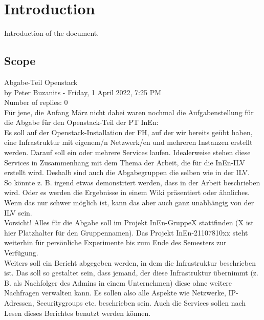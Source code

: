 \section{Introduction}
Introduction of the document.

\subsection{Scope}

Abgabe-Teil Openstack \\
by Peter Buzanits - Friday, 1 April 2022, 7:25 PM \\
Number of replies: 0 \\

\noindent
Für jene, die Anfang März nicht dabei waren nochmal die Aufgabenstellung für
die Abgabe für den Openstack-Teil der PT InEn: \\

\noindent
Es soll auf der Openstack-Installation der FH, auf der wir bereits geübt
haben, eine Infrastruktur mit eigenem/n Netzwerk/en und mehreren Instanzen
erstellt werden. Darauf soll ein oder mehrere Services laufen. Idealerweise
stehen diese Services in Zusammenhang mit dem Thema der Arbeit, die für die
InEn-ILV erstellt wird. Deshalb sind auch die Abgabegruppen die selben wie in
der ILV. \\

\noindent
So könnte z. B. irgend etwas demonstriert werden, dass in der Arbeit
beschrieben wird. Oder es werden die Ergebnisse in einem Wiki präsentiert oder
ähnliches. Wenn das nur schwer möglich ist, kann das aber auch ganz
unabhängig von der ILV sein. \\

\noindent
Vorsicht! Alles für die Abgabe soll im Projekt InEn-GruppeX stattfinden (X ist
hier Platzhalter für den Gruppennamen). Das Projekt InEn-21107810xx steht
weiterhin für persönliche Experimente bis zum Ende des Semesters zur
Verfügung. \\

\noindent
Weiters soll ein Bericht abgegeben werden, in dem die Infrastruktur beschrieben
ist. Das soll so gestaltet sein, dass jemand, der diese Infrastruktur
übernimmt (z. B. als Nachfolger des Admins in einem Unternehmen) diese ohne
weitere Nachfragen verwalten kann. Es sollen also alle Aspekte wie Netzwerke,
IP-Adressen, Securitygroups etc. beschrieben sein. Auch die Services sollen
nach Lesen dieses Berichtes benutzt werden können. \\

